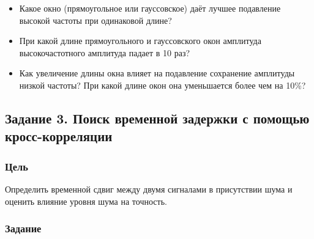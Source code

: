 \documentclass[12pt,a4paper,openany]{book}
\providecommand{\tightlist}{\setlength{\itemsep}{0pt}\setlength{\parskip}{0pt}}
\begin{document}
\begin{itemize}
\tightlist
\item
  Какое окно (прямоугольное или гауссовское) даёт лучшее подавление высокой частоты при одинаковой длине?
\item
  При какой длине прямоугольного и гауссовского окон амплитуда высокочастотного амплитуда падает в 10 раз?
\item
  Как увеличение длины окна влияет на подавление сохранение амплитуды низкой частоты? При какой длине окон она уменьшается более чем на 10\%?
\end{itemize}

\subsection*{Задание 3. Поиск временной задержки с помощью кросс-корреляции}

\subsubsection*{Цель}

Определить временной сдвиг между двумя сигналами в присутствии шума и оценить влияние уровня шума на точность.

\subsubsection*{Задание}
\end{document}
